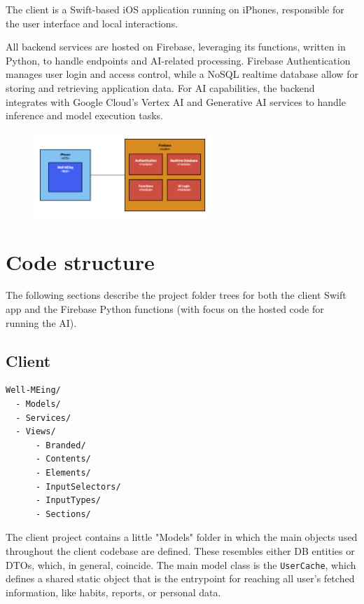 \documentclass{article}
\begin{document}
The client is a Swift-based iOS application running on iPhones, responsible for the user interface and local interactions.

All backend services are hosted on Firebase, leveraging its functions, written in Python, to handle endpoints and AI-related processing.
Firebase Authentication manages user login and access control, while a NoSQL realtime database allow for storing and retrieving application data.
For AI capabilities, the backend integrates with Google Cloud's Vertex AI and Generative AI services to handle inference and model execution tasks.

\begin{figure}[H]
	\centering
	\includegraphics[width=0.6\textwidth]{images/deployment-view.png}
\end{figure}

\section{Code structure}

The following sections describe the project folder trees for both the client Swift app and the Firebase Python functions (with focus on the hosted code for running the AI).

\subsection{Client}

\begin{verbatim}
Well-MEing/
  - Models/
  - Services/
  - Views/
      - Branded/
      - Contents/
      - Elements/
      - InputSelectors/
      - InputTypes/
      - Sections/
\end{verbatim}

The client project contains a little "Models" folder in which the main objects used throughout the client codebase are defined.
These resembles either DB entities or DTOs, which, in general, coincide.
The main model class is the \verb|UserCache|, which defines a shared static object that is the entrypoint for reaching all user's fetched information, like habits, reports, or personal data.
\end{document}
